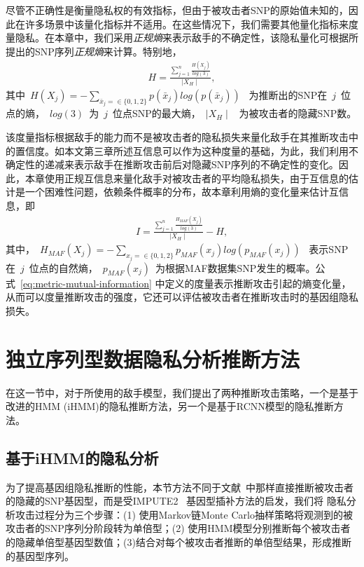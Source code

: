 尽管不正确性是衡量隐私权的有效指标，但由于被攻击者SNP的原始值未知的，因此在许多场景中该量化指标并不适用。在这些情况下，我们需要其他量化指标来度量隐私。在本章中，我们采用\textit{正规熵}来表示敌手的不确定性，该隐私量化可根据所提出的SNP序列\textit{正规熵}来计算。特别地，
\begin{align}\label{eq:metric-entropy}
H = \frac{\sum_{j=1}^n \frac{H(X_j)}{log(3)}}{\mid X_H \mid},
\end{align}
其中~$H(X_j)= -\sum_{\bar{x}_j=\in \{0,1,2\}}{p(\bar{x}_j)log(p(\bar{x}_j))}$~ 为推断出的SNP在~$j$~位点的熵，~$log(3)$~为~$j$~位点SNP的最大熵，~$\mid X_H \mid$~ 为被攻击者的隐藏SNP数。

该度量指标根据敌手的能力而不是被攻击者的隐私损失来量化敌手在其推断攻击中的置信度。如本文第三章所述互信息可以作为这种度量的基础，为此，我们利用不确定性的递减来表示敌手在推断攻击前后对隐藏SNP序列的不确定性的变化。因此，本章使用正规互信息来量化敌手对被攻击者的平均隐私损失，由于互信息的估计是一个困难性问题，依赖条件概率的分布，故本章利用熵的变化量来估计互信息，即
\begin{align}\label{eq:metric-mutual-information}
I = \frac{\sum_{j=1}^n \frac{H_{MAF}(X_j)}{log(3)}}{\mid X_H \mid}
- H,
\end{align}
其中，~$H_{MAF}(X_j) = -\sum_{x_j=\in \{0,1,2\}}{p_{MAF}(x_j)log(p_{MAF}(x_j))}$~ 表示SNP在~$j$~位点的自然熵，~$p_{MAF}(x_j)$~为根据MAF数据集SNP发生的概率。公式~\ref{eq:metric-mutual-information} 中定义的度量表示推断攻击引起的熵变化量，从而可以度量推断攻击的强度，它还可以评估被攻击者在推断攻击时的基因组隐私损失。

\section{独立序列型数据隐私分析推断方法}\label{sec:infer}

在这一节中，对于所使用的敌手模型，我们提出了两种推断攻击策略，一个是基于改进的HMM (iHMM)的隐私推断方法，另一个是基于RCNN模型的隐私推断方法。

\subsection{基于iHMM的隐私分析}

为了提高基因组隐私推断的性能，本节方法不同于文献~\cite{samani2015quantifying}中那样直接推断被攻击者的隐藏的SNP基因型，而是受IMPUTE2 ~\cite{howie2009flexible}基因型插补方法的启发，我们将
隐私分析攻击过程分为三个步骤：(1) 使用Markov链Monte Carlo抽样策略将观测到的被攻击者的SNP序列分阶段转为单倍型；(2) 使用HMM模型分别推断每个被攻击者的隐藏单倍型基因型数值；(3)结合对每个被攻击者推断的单倍型结果，形成推断的基因型序列。


